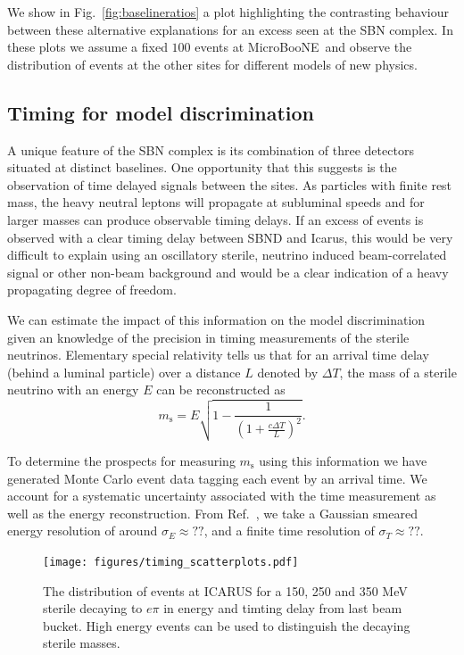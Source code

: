 \documentclass[11pt, a4paper]{article}
\newcommand{\reffig}[1]{Fig.~\ref{#1}}
\newcommand{\refref}[1]{Ref.~\cite{#1}}
\def\muboone{MicroBooNE}
\begin{document}
We show in \reffig{fig:baselineratios} a plot highlighting the contrasting
behaviour between these alternative explanations for an excess seen at the SBN
complex. In these plots we assume a fixed $100$ events at \muboone\ and observe
the distribution of events at the other sites for different models of new
physics.

\subsection{\label{sec:timing_physics}Timing for model discrimination}

A unique feature of the SBN complex is its combination of three detectors
situated at distinct baselines. One opportunity that this suggests is the
observation of time delayed signals between the sites. As particles with finite
rest mass, the heavy neutral leptons will propagate at subluminal speeds and
for larger masses can produce observable timing delays. If an excess of events
is observed with a clear timing delay between SBND and Icarus, this would be
very difficult to explain using an oscillatory sterile, neutrino induced
beam-correlated signal or other non-beam background and would be a clear
indication of a heavy propagating degree of freedom. 

We can estimate the impact of this information on the model discrimination
given an knowledge of the precision in timing measurements of the sterile
neutrinos. Elementary special relativity tells us that for an arrival time delay (behind a luminal particle) over a distance $L$ denoted by $\Delta T$, the mass of a sterile neutrino with an energy $E$ can be reconstructed as 
%
%
\[ m_\text{s} = E\sqrt{1-\frac{1}{\left(1+\frac{c\Delta T}{L}\right)^2}}. \]

To determine the prospects for measuring $m_\text{s}$ using this information we
have generated Monte Carlo event data tagging each event by an arrival time.
We account for a systematic uncertainty associated with the time measurement as
well as the energy reconstruction. From \refref{WHERE}, we take a Gaussian
smeared energy resolution of around $\sigma_E \approx ??$, and a finite time
resolution of $\sigma_T  \approx ??$. \\


\begin{figure}[t]
\center
\texttt{[image: figures/timing\_scatterplots.pdf]}
\caption{\label{fig:tof_scatter} The distribution of events at ICARUS for a 150, 250 and 350 MeV sterile decaying to $e \pi$ in energy and timting delay from last beam bucket. High energy events can be used to distinguish the decaying sterile masses.}
\end{figure}
\end{document}
